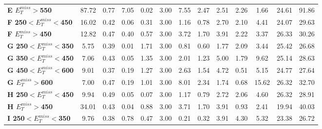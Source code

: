 \begin{table}[h]
\begin{center}
{\begin{tabular}{|l|ccccccccccc|c|}
\textbf{ E $E_T^{miss}>$550}    & 87.72         & 0.77          & 7.05          & 0.02          & 3.00          & 7.55          & 2.47          & 2.51          & 2.26          & 1.66          & 24.61         & 91.86         \\
\textbf{ F 250$<E_T^{miss}<$450}         & 16.02         & 0.42          & 0.06          & 0.31          & 3.00          & 1.16          & 0.78          & 2.70          & 2.10          & 4.41          & 24.07         & 29.63         \\
\textbf{ F $E_T^{miss}>$450}    & 12.82         & 0.47          & 0.40          & 0.57          & 3.00          & 3.72          & 1.70          & 3.91          & 2.22          & 3.37          & 26.33         & 30.26         \\
\textbf{ G 250$<E_T^{miss}<$350}         & 5.75          & 0.39          & 0.01          & 1.71          & 3.00          & 0.81          & 0.60          & 1.77          & 2.09          & 3.44          & 25.42         & 26.68         \\
\textbf{ G 350$<E_T^{miss}<$450}         & 7.06          & 0.43          & 0.05          & 1.35          & 3.00          & 2.01          & 1.23          & 5.00          & 1.79          & 9.62          & 25.14         & 28.63         \\
\textbf{ G 450$<E_T^{miss}<$600}         & 9.01          & 0.37          & 0.19          & 1.27          & 3.00          & 2.63          & 1.54          & 4.72          & 0.51          & 5.15          & 24.77         & 27.64         \\
\textbf{ G $E_T^{miss}>$600}    & 7.00          & 0.47          & 0.19          & 1.01          & 3.00          & 8.01          & 2.34          & 1.74          & 0.68          & 15.62         & 26.32         & 32.70         \\
\textbf{ H 250$<E_T^{miss}<$450}         & 9.94          & 0.49          & 0.05          & 0.07          & 3.00          & 1.17          & 0.79          & 2.72          & 2.06          & 4.60          & 26.32         & 28.91         \\
\textbf{ H $E_T^{miss}>$450}    & 34.01         & 0.43          & 0.04          & 0.88          & 3.00          & 3.71          & 1.70          & 3.91          & 0.93          & 2.41          & 19.94         & 40.03         \\
\hline
\textbf{ I 250$<E_T^{miss}<$350}         & 9.76          & 0.38          & 0.78          & 0.47          & 3.00          & 0.21          & 0.32          & 3.91          & 4.30          & 5.32          & 23.38         & 26.72         \\

\end{tabular}}
\end{center}
\end{table}
